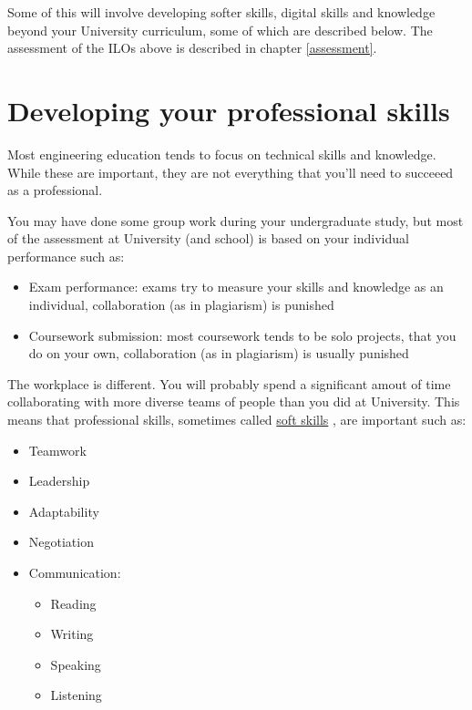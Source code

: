 \documentclass[
]{book}
\providecommand{\tightlist}{%
  \setlength{\itemsep}{0pt}\setlength{\parskip}{0pt}}
\begin{document}
Some of this will involve developing softer skills, digital skills and knowledge beyond your University curriculum, some of which are described below. The assessment of the ILOs above is described in chapter \ref{assessment}.

\section{Developing your professional skills}\label{soft}

Most engineering education tends to focus on technical skills and knowledge. While these are important, they are not everything that you'll need to succeeed as a professional.

You may have done some group work during your undergraduate study, but most of the assessment at University (and school) is based on your individual performance such as:

\begin{itemize}
\tightlist
\item
  Exam performance: exams try to measure your skills and knowledge as an individual, collaboration (as in plagiarism) is punished
\item
  Coursework submission: most coursework tends to be solo projects, that you do on your own, collaboration (as in plagiarism) is usually punished
\end{itemize}

The workplace is different. You will probably spend a significant amout of time collaborating with more diverse teams of people than you did at University. This means that professional skills, sometimes called \href{https://en.wikipedia.org/wiki/Soft_skills}{soft skills} , are important such as:

\begin{itemize}
\tightlist
\item
  Teamwork \citep{soft}
\item
  Leadership \citep{transferable}
\item
  Adaptability \citep{professionalism}
\item
  Negotiation \citep{verbalising}
\item
  Communication:

  \begin{itemize}
  \tightlist
  \item
    Reading \citep{reading}
  \item
    Writing \citep{writing}
  \item
    Speaking \citep{speaking}
  \item
    Listening \citep{hearing}
  \end{itemize}
\end{itemize}
\end{document}

